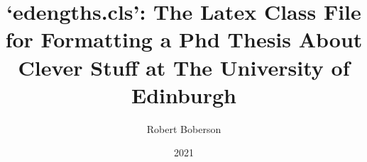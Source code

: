 \documentclass{edengths}
\begin{document}








\graphicspath{{chapter1/}{chapter2/}}%




\author{Robert Boberson}

\title{`edengths.cls': The Latex Class File for Formatting
a Phd Thesis About Clever Stuff at The University of Edinburgh}



\date{2021}




% 
% 
% 
\end{document}
